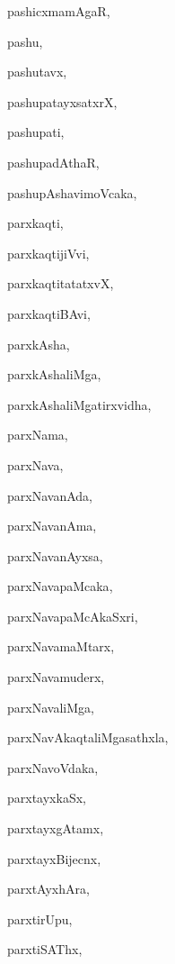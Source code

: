 \begin{multicols}{2}
{pashicxmamAgaR}, \pageref{pashicxmamAgaR}

{pashu}, \pageref{pashu}

{pashutavx}, \pageref{pashutavx}

{pashupatayxsatxrX}, \pageref{pashupatayxsatxrX}

{pashupati}, \pageref{pashupati}

{pashupadAthaR}, \pageref{pashupadAthaR}

{pashupAshavimoVcaka}, \pageref{pashupAshavimoVcaka}

{parxkaqti}, \pageref{parxkaqti}

{parxkaqtijiVvi}, \pageref{parxkaqtijiVvi}

{parxkaqtitatatxvX}, \pageref{parxkaqtitatatxvX}

{parxkaqtiBAvi}, \pageref{parxkaqtiBAvi}

{parxkAsha}, \pageref{parxkAsha}

{parxkAshaliMga}, \pageref{parxkAshaliMga}

{parxkAshaliMgatirxvidha}, \pageref{parxkAshaliMgatirxvidha}

{parxNama}, \pageref{parxNama}

{parxNava}, \pageref{parxNava}

{parxNavanAda}, \pageref{parxNavanAda}

{parxNavanAma}, \pageref{parxNavanAma}

{parxNavanAyxsa}, \pageref{parxNavanAyxsa}

{parxNavapaMcaka}, \pageref{parxNavapaMcaka}

{parxNavapaMcAkaSxri}, \pageref{parxNavapaMcAkaSxri}

{parxNavamaMtarx}, \pageref{parxNavamaMtarx}

{parxNavamuderx}, \pageref{parxNavamuderx}

{parxNavaliMga}, \pageref{parxNavaliMga}

{parxNavAkaqtaliMgasathxla}, \pageref{parxNavAkaqtaliMgasathxla}

{parxNavoVdaka}, \pageref{parxNavoVdaka}

{parxtayxkaSx}, \pageref{parxtayxkaSx}

{parxtayxgAtamx}, \pageref{parxtayxgAtamx}

{parxtayxBijecnx}, \pageref{parxtayxBijecnx}

{parxtAyxhAra}, \pageref{parxtAyxhAra}

{parxtirUpu}, \pageref{parxtirUpu}

{parxtiSAThx}, \pageref{parxtiSAThx}


\end{multicols}
